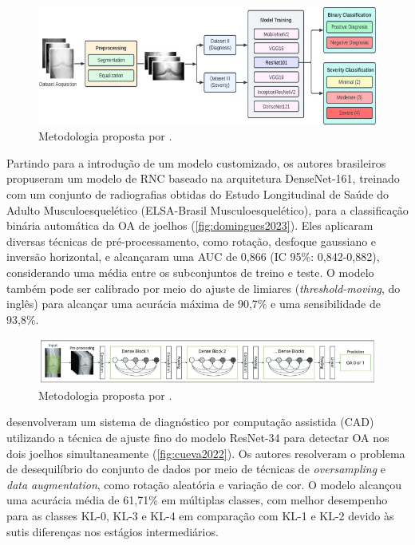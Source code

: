 \begin{figure}[ht]
    \centering
    \includegraphics[width=\textwidth]{figs/mohammed2023.jpg}
    \caption{Metodologia proposta por \cite{Mohammed2023}.}
    \label{fig:mohammed2023}
\end{figure}

Partindo para a introdução de um modelo customizado, os autores brasileiros \cite{domingues2023} propuseram um modelo de RNC baseado na arquitetura DenseNet-161, treinado com um conjunto de radiografias obtidas do Estudo Longitudinal de Saúde do Adulto Musculoesquelético (ELSA-Brasil Musculoesquelético), para a classificação binária automática da OA de joelhos (\autoref{fig:domingues2023}). Eles aplicaram diversas técnicas de pré-processamento, como rotação, desfoque gaussiano e inversão horizontal, e alcançaram uma AUC de 0,866 (IC 95\%: 0,842-0,882), considerando uma média entre os subconjuntos de treino e teste. O modelo também pode ser calibrado por meio do ajuste de limiares (\textit{threshold-moving}, do inglês) para alcançar uma acurácia máxima de 90,7\% e uma sensibilidade de 93,8\%.

\begin{figure}[ht]
    \centering
    \includegraphics[width=\textwidth]{figs/domingues2023.png}
    \caption{Metodologia proposta por \cite{domingues2023}.}
    \label{fig:domingues2023}
\end{figure}

\cite{Cueva2022} desenvolveram um sistema de diagnóstico por computação assistida (CAD) utilizando a técnica de ajuste fino do modelo ResNet-34 para detectar OA nos dois joelhos simultaneamente (\autoref{fig:cueva2022}). Os autores resolveram o problema de desequilíbrio do conjunto de dados por meio de técnicas de \textit{oversampling} e \textit{data augmentation}, como rotação aleatória e variação de cor. O modelo alcançou uma acurácia média de 61,71\% em múltiplas classes, com melhor desempenho para as classes KL-0, KL-3 e KL-4 em comparação com KL-1 e KL-2 devido às sutis diferenças nos estágios intermediários.

